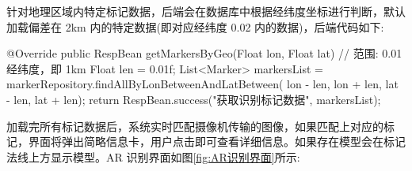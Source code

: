 针对地理区域内特定标记数据，后端会在数据库中根据经纬度坐标进行判断，默认加载偏差在 2km 内的特定数据(即对应经纬度 0.02 内的数据)，后端代码如下:

\begin{JavaScript}
@Override
public RespBean getMarkersByGeo(Float lon, Float lat) {
    // 范围: 0.01 经纬度，即 1km
    Float len = 0.01f;
    List<Marker> markersList = markerRepository.findAllByLonBetweenAndLatBetween(
        lon - len, lon + len, lat - len, lat + len);
    return RespBean.success("获取识别标记数据", markersList);
}
\end{JavaScript}

加载完所有标记数据后，系统实时匹配摄像机传输的图像，如果匹配上对应的标记，界面将弹出简略信息卡，用户点击即可查看详细信息。如果存在模型会在标记法线上方显示模型。AR 识别界面如图\ref{fig:AR识别界面}所示:

